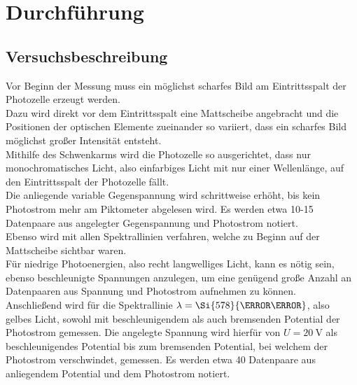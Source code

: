 \section{Durchführung}
\label{sec:Durchführung}



\subsection{Versuchsbeschreibung}
\label{sec:Versuchsbeschreibung}
Vor Beginn der Messung muss ein möglichst scharfes Bild am Eintrittsspalt der Photozelle erzeugt werden.\\
Dazu wird direkt vor dem Eintrittsspalt eine Mattscheibe angebracht und die Positionen der optischen Elemente zueinander so variiert, dass ein scharfes Bild möglichst großer Intensität entsteht.\\
Mithilfe des Schwenkarms wird die Photozelle so ausgerichtet, dass nur monochromatisches Licht, also einfarbiges Licht mit nur einer Wellenlänge, auf den Eintrittsspalt der Photozelle fällt.\\
Die anliegende variable Gegenspannung wird schrittweise erhöht, bis kein Photostrom mehr am Piktometer abgelesen wird. Es werden etwa 10-15 Datenpaare aus angelegter Gegenspannung und Photostrom notiert.\\
Ebenso wird mit allen Spektrallinien verfahren, welche zu Beginn auf der Mattscheibe sichtbar waren.\\
Für niedrige Photoenergien, also recht langwelliges Licht, kann es nötig sein, ebenso beschleunigte Spannungen anzulegen, um eine genügend große Anzahl an Datenpaaren aus Spannung und Photostrom aufnehmen zu können.\\
Anschließend wird für die Spektrallinie $\lambda=\Si{578}{\nano\meter}$, also gelbes Licht, sowohl mit beschleunigendem als auch bremsenden Potential der Photostrom gemessen.
Die angelegte Spannung wird hierfür von $U=\SI{+20}{\volt}$ als beschleunigendes Potential bis zum bremsenden Potential, bei welchem der Photostrom verschwindet, gemessen.
Es werden etwa 40 Datenpaare aus anliegendem Potential und dem Photostrom notiert.

